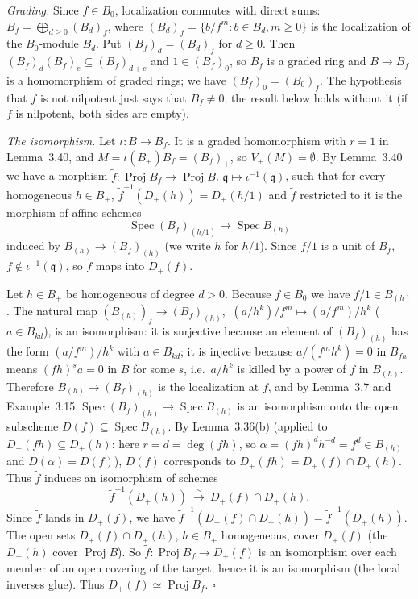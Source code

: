 \documentclass[11pt]{article}
\begin{document}
\pf
\emph{Grading.} Since $f\in B_0$, localization commutes with direct sums: $B_f=\bigoplus_{d\geq0}(B_d)_f$, where $(B_d)_f=\{b/f^m:b\in B_d,m\geq0\}$ is the localization of the $B_0$-module $B_d$. Put $(B_f)_d=(B_d)_f$ for $d\geq0$. Then $(B_f)_d(B_f)_e\subseteq(B_f)_{d+e}$ and $1\in(B_f)_0$, so $B_f$ is a graded ring and $B\to B_f$ is a homomorphism of graded rings; we have $(B_f)_0=(B_0)_f$. The hypothesis that $f$ is not nilpotent just says that $B_f\neq0$; the result below holds without it (if $f$ is nilpotent, both sides are empty).

\emph{The isomorphism.} Let $\iota:B\to B_f$. It is a graded homomorphism with $r=1$ in Lemma~3.40, and $M=\iota(B_+)B_f=(B_f)_+$, so $V_+(M)=\emptyset$. By Lemma~3.40 we have a morphism $\tilde f:\operatorname{Proj}B_f\to\operatorname{Proj}B$, $\mathfrak{q}\mapsto\iota^{-1}(\mathfrak{q})$, such that for every homogeneous $h\in B_+$, $\tilde f^{-1}(D_+(h))=D_+(h/1)$ and $\tilde f$ restricted to it is the morphism of affine schemes
\[ \operatorname{Spec}(B_f)_{(h/1)}\to\operatorname{Spec}B_{(h)} \]
induced by $B_{(h)}\to(B_f)_{(h)}$ (we write $h$ for $h/1$). Since $f/1$ is a unit of $B_f$, $f\notin\iota^{-1}(\mathfrak{q})$, so $\tilde f$ maps into $D_+(f)$.

Let $h\in B_+$ be homogeneous of degree $d>0$. Because $f\in B_0$ we have $f/1\in B_{(h)}$. The natural map $(B_{(h)})_f\to(B_f)_{(h)}$, $\ (a/h^k)/f^m\mapsto(a/f^m)/h^k$ ($a\in B_{kd}$), is an isomorphism: it is surjective because an element of $(B_f)_{(h)}$ has the form $(a/f^m)/h^k$ with $a\in B_{kd}$; it is injective because $a/(f^mh^k)=0$ in $B_{fh}$ means $(fh)^sa=0$ in $B$ for some $s$, i.e.\ $a/h^k$ is killed by a power of $f$ in $B_{(h)}$. Therefore $B_{(h)}\to(B_f)_{(h)}$ is the localization at $f$, and by Lemma~3.7 and Example~3.15 $\operatorname{Spec}(B_f)_{(h)}\to\operatorname{Spec}B_{(h)}$ is an isomorphism onto the open subscheme $D(f)\subseteq\operatorname{Spec}B_{(h)}$. By Lemma~3.36(b) (applied to $D_+(fh)\subseteq D_+(h)$: here $r=d=\deg(fh)$, so $\alpha=(fh)^dh^{-d}=f^d\in B_{(h)}$ and $D(\alpha)=D(f)$), $D(f)$ corresponds to $D_+(fh)=D_+(f)\cap D_+(h)$. Thus $\tilde f$ induces an isomorphism of schemes
\[ \tilde f^{-1}(D_+(h))\ \xrightarrow{\ \sim\ }\ D_+(f)\cap D_+(h). \]
Since $\tilde f$ lands in $D_+(f)$, we have $\tilde f^{-1}(D_+(f)\cap D_+(h))=\tilde f^{-1}(D_+(h))$. The open sets $D_+(f)\cap D_+(h)$, $h\in B_+$ homogeneous, cover $D_+(f)$ (the $D_+(h)$ cover $\operatorname{Proj}B$). So $\tilde f:\operatorname{Proj}B_f\to D_+(f)$ is an isomorphism over each member of an open covering of the target; hence it is an isomorphism (the local inverses glue). Thus $D_+(f)\simeq\operatorname{Proj}B_f$. \hfill$\square$
\end{document}
